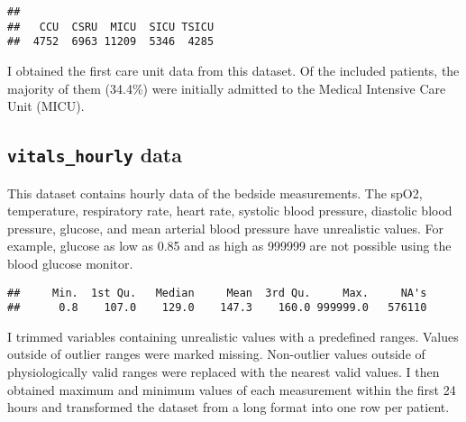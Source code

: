 \documentclass[
]{article}
\newenvironment{Shaded}{\begin{snugshade}}{\end{snugshade}}
\newcommand{\FunctionTok}[1]{\textcolor[rgb]{0.13,0.29,0.53}{\textbf{#1}}}
\newcommand{\NormalTok}[1]{#1}
\newcommand{\SpecialCharTok}[1]{\textcolor[rgb]{0.81,0.36,0.00}{\textbf{#1}}}
\begin{document}
\begin{Shaded}
\end{Shaded}

\begin{verbatim}
## 
##   CCU  CSRU  MICU  SICU TSICU 
##  4752  6963 11209  5346  4285
\end{verbatim}

I obtained the first care unit data from this dataset. Of the included
patients, the majority of them (34.4\%) were initially admitted to the
Medical Intensive Care Unit (MICU).

\hypertarget{vitals_hourly-data}{%
\subsection{\texorpdfstring{\texttt{vitals\_hourly}
data}{vitals\_hourly data}}\label{vitals_hourly-data}}

This dataset contains hourly data of the bedside measurements. The spO2,
temperature, respiratory rate, heart rate, systolic blood pressure,
diastolic blood pressure, glucose, and mean arterial blood pressure have
unrealistic values. For example, glucose as low as 0.85 and as high as
999999 are not possible using the blood glucose monitor.

\begin{Shaded}
\end{Shaded}

\begin{verbatim}
##     Min.  1st Qu.   Median     Mean  3rd Qu.     Max.     NA's 
##      0.8    107.0    129.0    147.3    160.0 999999.0   576110
\end{verbatim}

I trimmed variables containing unrealistic values with a predefined
ranges. Values outside of outlier ranges were marked missing.
Non-outlier values outside of physiologically valid ranges were replaced
with the nearest valid values. I then obtained maximum and minimum
values of each measurement within the first 24 hours and transformed the
dataset from a long format into one row per patient.
\end{document}
